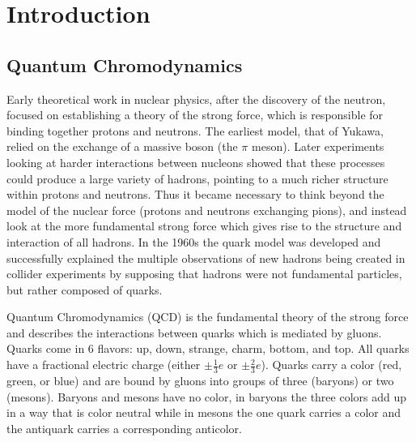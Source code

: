 \chapter{Introduction}

\section{Quantum Chromodynamics}

Early theoretical work in nuclear physics, after the discovery of the neutron, focused on establishing a theory of the strong force, which is responsible for binding together protons and neutrons. The earliest model, that of Yukawa, relied on the exchange of a massive boson (the $\pi$ meson). Later experiments looking at harder interactions between nucleons showed that these processes could produce a large variety of hadrons, pointing to a much richer structure within protons and neutrons. Thus it became necessary to think beyond the model of the nuclear force (protons and neutrons exchanging pions), and instead look at the more fundamental strong force which gives rise to the structure and interaction of all hadrons. In the 1960s the quark model was developed and successfully explained the multiple observations of new hadrons being created in collider experiments by supposing that hadrons were not fundamental particles, but rather composed of quarks.

Quantum Chromodynamics (QCD) is the fundamental theory of the strong force and describes the interactions between quarks which is mediated by gluons. Quarks come in 6 flavors: up, down, strange, charm, bottom, and top. All quarks have a fractional electric charge (either $\pm \frac{1}{3}e$ or $\pm \frac{2}{3}e$). Quarks carry a color (red, green, or blue) and are bound by gluons into groups of three (baryons) or two (mesons). Baryons and mesons have no color, in baryons the three colors add up in a way that is color neutral while in mesons the one quark carries a color and the antiquark carries a corresponding anticolor. 

